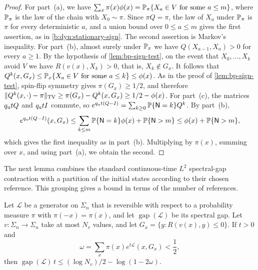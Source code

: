 \begin{proof}
For part~(a), we have $\sum_x\pi(x)\phi(x)=\mathbb P_\pi\{X_a\in V\text{ for some }a\le m\}$, where $\mathbb P_\pi$ is the law of the chain with $X_0\sim\pi$. Since $\pi Q=\pi$, the law of $X_a$ under $\mathbb P_\pi$ is $\pi$ for every deterministic $a$, and a union bound over $0\le a\le m$ gives the first assertion, as in \eqref{b:dyn:stationary-sign}. The second assertion is Markov's inequality. For part~(b), almost surely under $\mathbb P_x$ we have $Q(X_{a-1},X_a)>0$ for every $a\ge1$. By the hypothesis of \cref{lem:bp-sign-test}, on the event that $X_0,\dots,X_k$ avoid $V$ we have $R(v(x),X_k)>0$, that is, $X_k\notin G_x$. It follows that $Q^k(x,G_x)\le\mathbb P_x\{X_a\in V\text{ for some }a\le k\}\le \phi(x)$. As in the proof of \cref{lem:bp-sign-test}, spin-flip symmetry gives $\pi(G_x)\ge1/2$, and therefore $\lVert Q^k(x,\cdot)-\pi\rVert_{\mathrm{TV}}\ge\pi(G_x)-Q^k(x,G_x)\ge1/2-\phi(x)$. For part~(c), the matrices $q_{\rm u}tQ$ and $q_{\rm u}tI$ commute, so $e^{q_{\rm u}t(Q-I)}=\sum_{k\ge0}\mathbb P\{\mathsf N=k\}Q^k$. By part~(b),
\[
 e^{q_{\rm u}t(Q-I)}(x,G_x)\le\sum_{k\le m}\mathbb P\{\mathsf N=k\}\phi(x)+\mathbb P\{\mathsf N>m\}\le \phi(x)+\mathbb P\{\mathsf N>m\},
\]
which gives the first inequality as in part~(b). Multiplying by $\pi(x)$, summing over $x$, and using part~(a), we obtain the second.
\end{proof}

The next lemma combines the standard continuous-time $L^2$ spectral-gap
contraction \cite[Lemma~20.5]{levin-peres-2017} with a partition of the
initial states according to their chosen reference. This grouping gives a
bound in terms of the number of references.

\begin{lemma}\label{lem:bp-gap}
Let $\mathcal L$ be a generator on $\Sigma_n$ that is reversible with respect to a probability measure $\pi$ with $\pi(-x)=\pi(x)$, and let $\operatorname{gap}(\mathcal L)$ be its spectral gap. Let $v\colon\Sigma_n\to\Sigma_n$ take at most $N_v$ values, and let $G_x=\{y:R(v(x),y)\le0\}$. If $t>0$ and
\[
 \omega=\sum_x\pi(x)e^{t\mathcal L}(x,G_x)<\frac12,
\]
then $\operatorname{gap}(\mathcal L)\,t\le(\log N_v)/2-\log(1-2\omega)$.
\end{lemma}

